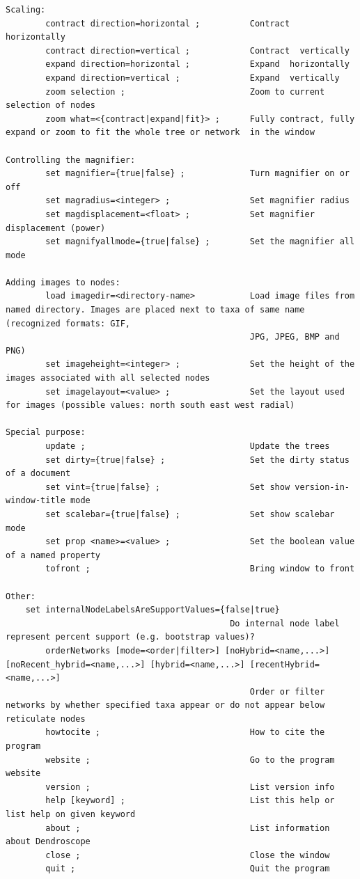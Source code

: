 \documentclass[11pt]{article}
\begin{document}
\begin{verbatim}
Scaling:
        contract direction=horizontal ;          Contract  horizontally
        contract direction=vertical ;            Contract  vertically
        expand direction=horizontal ;            Expand  horizontally
        expand direction=vertical ;              Expand  vertically
        zoom selection ;                         Zoom to current selection of nodes
        zoom what=<{contract|expand|fit}> ;      Fully contract, fully expand or zoom to fit the whole tree or network  in the window                        

Controlling the magnifier:
        set magnifier={true|false} ;             Turn magnifier on or off
        set magradius=<integer> ;                Set magnifier radius
        set magdisplacement=<float> ;            Set magnifier displacement (power)
        set magnifyallmode={true|false} ;        Set the magnifier all mode

Adding images to nodes:
        load imagedir=<directory-name>           Load image files from named directory. Images are placed next to taxa of same name (recognized formats: GIF, 
                                                 JPG, JPEG, BMP and PNG)
        set imageheight=<integer> ;              Set the height of the images associated with all selected nodes
        set imagelayout=<value> ;                Set the layout used for images (possible values: north south east west radial)

Special purpose:
        update ;                                 Update the trees
        set dirty={true|false} ;                 Set the dirty status of a document
        set vint={true|false} ;                  Set show version-in-window-title mode
        set scalebar={true|false} ;              Set show scalebar mode
        set prop <name>=<value> ;                Set the boolean value of a named property
        tofront ;                                Bring window to front

Other:
	set internalNodeLabelsAreSupportValues={false|true}
	                                         Do internal node label represent percent support (e.g. bootstrap values)?
        orderNetworks [mode=<order|filter>] [noHybrid=<name,...>] [noRecent_hybrid=<name,...>] [hybrid=<name,...>] [recentHybrid=<name,...>]
                                                 Order or filter networks by whether specified taxa appear or do not appear below reticulate nodes
        howtocite ;                              How to cite the program
        website ;                                Go to the program website
        version ;                                List version info
        help [keyword] ;                         List this help or list help on given keyword 
        about ;                                  List information about Dendroscope
        close ;                                  Close the window
        quit ;                                   Quit the program

\end{verbatim}
\normalsize
\end{document}
